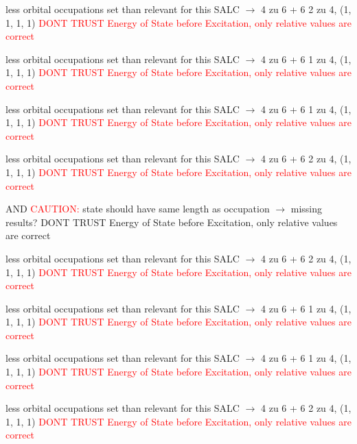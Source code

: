 \documentclass[12pt,a4paper]{article}
\begin{document}
less orbital occupations set than relevant for this SALC $\rightarrow$ 
4 zu 6 + 6 
2 zu 4, (1, 1, 1, 1) 
\textcolor{red}{DONT TRUST \glqq{}Energy of State before Excitation\grqq{}, only relative values are correct}

less orbital occupations set than relevant for this SALC $\rightarrow$ 
4 zu 6 + 6 
1 zu 4, (1, 1, 1, 1) 
\textcolor{red}{DONT TRUST \glqq{}Energy of State before Excitation\grqq{}, only relative values are correct}

less orbital occupations set than relevant for this SALC $\rightarrow$ 
4 zu 6 + 6 
1 zu 4, (1, 1, 1, 1) 
\textcolor{red}{DONT TRUST \glqq{}Energy of State before Excitation\grqq{}, only relative values are correct}

less orbital occupations set than relevant for this SALC $\rightarrow$ 
4 zu 6 + 6 
2 zu 4, (1, 1, 1, 1) 
\textcolor{red}{DONT TRUST \glqq{}Energy of State before Excitation\grqq{}, only relative values are correct}

 AND 	\textcolor{red}{CAUTION:} state should have same length as occupation $\rightarrow$ missing results?
	DONT TRUST \glqq{}Energy of State before Excitation\grqq{}, only relative values are correct

less orbital occupations set than relevant for this SALC $\rightarrow$ 
4 zu 6 + 6 
2 zu 4, (1, 1, 1, 1) 
\textcolor{red}{DONT TRUST \glqq{}Energy of State before Excitation\grqq{}, only relative values are correct}

less orbital occupations set than relevant for this SALC $\rightarrow$ 
4 zu 6 + 6 
1 zu 4, (1, 1, 1, 1) 
\textcolor{red}{DONT TRUST \glqq{}Energy of State before Excitation\grqq{}, only relative values are correct}

less orbital occupations set than relevant for this SALC $\rightarrow$ 
4 zu 6 + 6 
1 zu 4, (1, 1, 1, 1) 
\textcolor{red}{DONT TRUST \glqq{}Energy of State before Excitation\grqq{}, only relative values are correct}

less orbital occupations set than relevant for this SALC $\rightarrow$ 
4 zu 6 + 6 
2 zu 4, (1, 1, 1, 1) 
\textcolor{red}{DONT TRUST \glqq{}Energy of State before Excitation\grqq{}, only relative values are correct}
\end{document}
